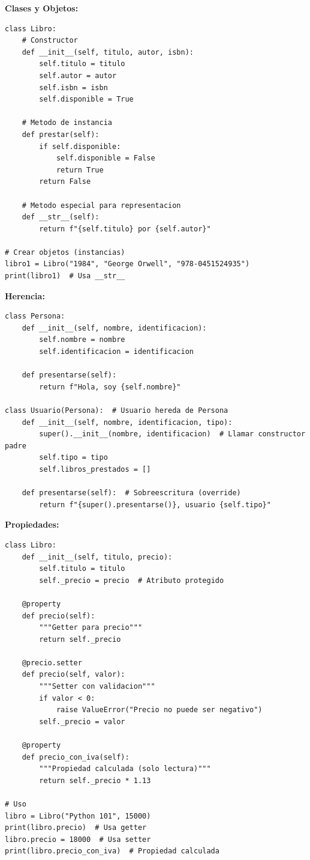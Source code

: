 \documentclass[11pt,letterpaper]{article}
\begin{document}
\textbf{Clases y Objetos:}
\begin{lstlisting}[caption={Definición básica de clase}]
class Libro:
    # Constructor
    def __init__(self, titulo, autor, isbn):
        self.titulo = titulo
        self.autor = autor
        self.isbn = isbn
        self.disponible = True
    
    # Metodo de instancia
    def prestar(self):
        if self.disponible:
            self.disponible = False
            return True
        return False
    
    # Metodo especial para representacion
    def __str__(self):
        return f"{self.titulo} por {self.autor}"

# Crear objetos (instancias)
libro1 = Libro("1984", "George Orwell", "978-0451524935")
print(libro1)  # Usa __str__
\end{lstlisting}

\textbf{Herencia:}
\begin{lstlisting}[caption={Herencia de clases}]
class Persona:
    def __init__(self, nombre, identificacion):
        self.nombre = nombre
        self.identificacion = identificacion
    
    def presentarse(self):
        return f"Hola, soy {self.nombre}"

class Usuario(Persona):  # Usuario hereda de Persona
    def __init__(self, nombre, identificacion, tipo):
        super().__init__(nombre, identificacion)  # Llamar constructor padre
        self.tipo = tipo
        self.libros_prestados = []
    
    def presentarse(self):  # Sobreescritura (override)
        return f"{super().presentarse()}, usuario {self.tipo}"
\end{lstlisting}

\textbf{Propiedades:}
\begin{lstlisting}[caption={Uso de @property}]
class Libro:
    def __init__(self, titulo, precio):
        self.titulo = titulo
        self._precio = precio  # Atributo protegido
    
    @property
    def precio(self):
        """Getter para precio"""
        return self._precio
    
    @precio.setter
    def precio(self, valor):
        """Setter con validacion"""
        if valor < 0:
            raise ValueError("Precio no puede ser negativo")
        self._precio = valor
    
    @property
    def precio_con_iva(self):
        """Propiedad calculada (solo lectura)"""
        return self._precio * 1.13

# Uso
libro = Libro("Python 101", 15000)
print(libro.precio)  # Usa getter
libro.precio = 18000  # Usa setter
print(libro.precio_con_iva)  # Propiedad calculada
\end{lstlisting}
\end{document}

